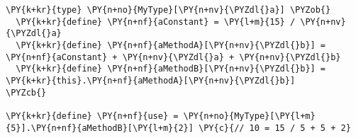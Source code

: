 \begin{Verbatim}[commandchars=\\\{\}]
\PY{k+kr}{type} \PY{n+no}{MyType}[\PY{n+nv}{\PYZdl{}a}] \PYZob{}
  \PY{k+kr}{define} \PY{n+nf}{aConstant} = \PY{l+m}{15} / \PY{n+nv}{\PYZdl{}a}
  \PY{k+kr}{define} \PY{n+nf}{aMethodA}[\PY{n+nv}{\PYZdl{}b}] = \PY{n+nf}{aConstant} + \PY{n+nv}{\PYZdl{}a} + \PY{n+nv}{\PYZdl{}b}
  \PY{k+kr}{define} \PY{n+nf}{aMethodB}[\PY{n+nv}{\PYZdl{}b}] = \PY{k+kr}{this}.\PY{n+nf}{aMethodA}[\PY{n+nv}{\PYZdl{}b}]
\PYZcb{}

\PY{k+kr}{define} \PY{n+nf}{use} = \PY{n+no}{MyType}[\PY{l+m}{5}].\PY{n+nf}{aMethodB}[\PY{l+m}{2}] \PY{c}{// 10 = 15 / 5 + 5 + 2}
\end{Verbatim}
